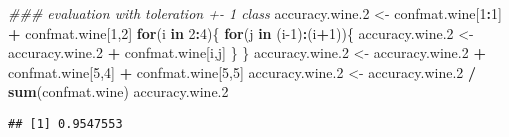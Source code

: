 \documentclass[]{article}
\newenvironment{Shaded}{\begin{snugshade}}{\end{snugshade}}
\newcommand{\CommentTok}[1]{\textcolor[rgb]{0.56,0.35,0.01}{\textit{#1}}}
\newcommand{\ControlFlowTok}[1]{\textcolor[rgb]{0.13,0.29,0.53}{\textbf{#1}}}
\newcommand{\DecValTok}[1]{\textcolor[rgb]{0.00,0.00,0.81}{#1}}
\newcommand{\FloatTok}[1]{\textcolor[rgb]{0.00,0.00,0.81}{#1}}
\newcommand{\KeywordTok}[1]{\textcolor[rgb]{0.13,0.29,0.53}{\textbf{#1}}}
\newcommand{\NormalTok}[1]{#1}
\newcommand{\OperatorTok}[1]{\textcolor[rgb]{0.81,0.36,0.00}{\textbf{#1}}}
\newcommand{\StringTok}[1]{\textcolor[rgb]{0.31,0.60,0.02}{#1}}
\begin{document}
\begin{Shaded}
\begin{Highlighting}[]
\CommentTok{### evaluation with toleration +- 1 class}
\NormalTok{accuracy.wine}\FloatTok{.2}\NormalTok{ <-}\StringTok{ }\NormalTok{confmat.wine[}\DecValTok{1}\OperatorTok{:}\DecValTok{1}\NormalTok{] }\OperatorTok{+}\StringTok{ }\NormalTok{confmat.wine[}\DecValTok{1}\NormalTok{,}\DecValTok{2}\NormalTok{]}
\ControlFlowTok{for}\NormalTok{(i }\ControlFlowTok{in} \DecValTok{2}\OperatorTok{:}\DecValTok{4}\NormalTok{)\{}
  \ControlFlowTok{for}\NormalTok{(j }\ControlFlowTok{in}\NormalTok{ (i}\DecValTok{-1}\NormalTok{)}\OperatorTok{:}\NormalTok{(i}\OperatorTok{+}\DecValTok{1}\NormalTok{))\{}
\NormalTok{    accuracy.wine}\FloatTok{.2}\NormalTok{ <-}\StringTok{ }\NormalTok{accuracy.wine}\FloatTok{.2} \OperatorTok{+}\StringTok{ }\NormalTok{confmat.wine[i,j]}
\NormalTok{  \}}
\NormalTok{\}}
\NormalTok{accuracy.wine}\FloatTok{.2}\NormalTok{ <-}\StringTok{ }\NormalTok{accuracy.wine}\FloatTok{.2} \OperatorTok{+}\StringTok{ }\NormalTok{confmat.wine[}\DecValTok{5}\NormalTok{,}\DecValTok{4}\NormalTok{] }\OperatorTok{+}\StringTok{ }\NormalTok{confmat.wine[}\DecValTok{5}\NormalTok{,}\DecValTok{5}\NormalTok{]}
\NormalTok{accuracy.wine}\FloatTok{.2}\NormalTok{ <-}\StringTok{ }\NormalTok{accuracy.wine}\FloatTok{.2} \OperatorTok{/}\StringTok{ }\KeywordTok{sum}\NormalTok{(confmat.wine)}
\NormalTok{accuracy.wine}\FloatTok{.2}
\end{Highlighting}
\end{Shaded}

\begin{verbatim}
## [1] 0.9547553
\end{verbatim}
\end{document}
